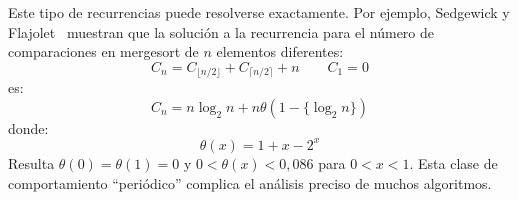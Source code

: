   Este tipo de recurrencias puede resolverse exactamente.
  Por ejemplo,
  Sedgewick y Flajolet~\cite{sedgewick13:_introd_anal_algor}
  muestran que la solución a la recurrencia
  para el número de comparaciones
  en mergesort de \(n\) elementos diferentes:
  \begin{equation}
    \label{eq:mergesort-compares-exact}
    C_n
      = C_{\lfloor n / 2 \rfloor} + C_{\lceil n / 2 \rceil} + n
    \qquad C_1 = 0
  \end{equation}
  es:
  \begin{equation}
    \label{eq:mergesort-compares-exact-solution}
    C_n
      = n \log_2 n + n \theta(1 - \{ \log_2 n \})
  \end{equation}
  donde:
  \begin{equation}
    \label{eq:mergesort-theta}
    \theta(x)
      = 1 + x - 2^x
  \end{equation}
  Resulta \(\theta(0) = \theta(1) = 0\)
  y \(0 < \theta(x) < 0,086\)
  para \(0 < x < 1\).
  Esta clase de comportamiento ``periódico''
  complica el análisis preciso de muchos algoritmos.

